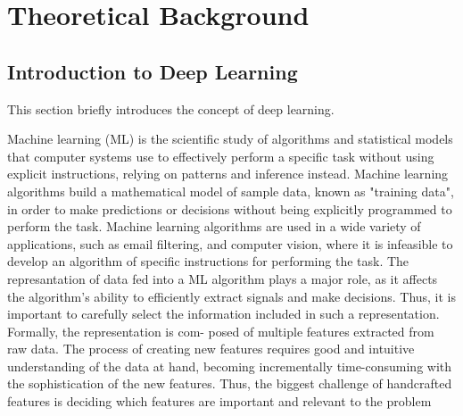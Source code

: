 \section{Theoretical Background}
\subsection{Introduction to Deep Learning}
This section briefly introduces the concept of deep learning. \par
\vspace{1em}
Machine learning (ML) is the scientific study of algorithms and statistical models that computer systems use to effectively perform a specific task without using explicit instructions, relying on patterns and inference instead. Machine learning algorithms build a mathematical model of sample data, known as "training data", in order to make predictions or decisions without being explicitly programmed to perform the task. Machine learning algorithms are used in a wide variety of applications, such as email filtering, and computer vision, where it is infeasible to develop an algorithm of specific instructions for performing the task. The represantation of data fed into a ML algorithm plays a major role, as it affects the algorithm’s ability to efficiently extract signals and make decisions. Thus, it is important to carefully select the information included in such a representation. Formally, the representation is com- posed of multiple features extracted from raw data. The process of creating new features requires good and intuitive understanding of the data at hand, becoming incrementally time-consuming with the sophistication of the new features. Thus, the biggest challenge of handcrafted features is deciding which features are important and relevant to the problem \cite{Goodfellow-et-al-2016}\par


